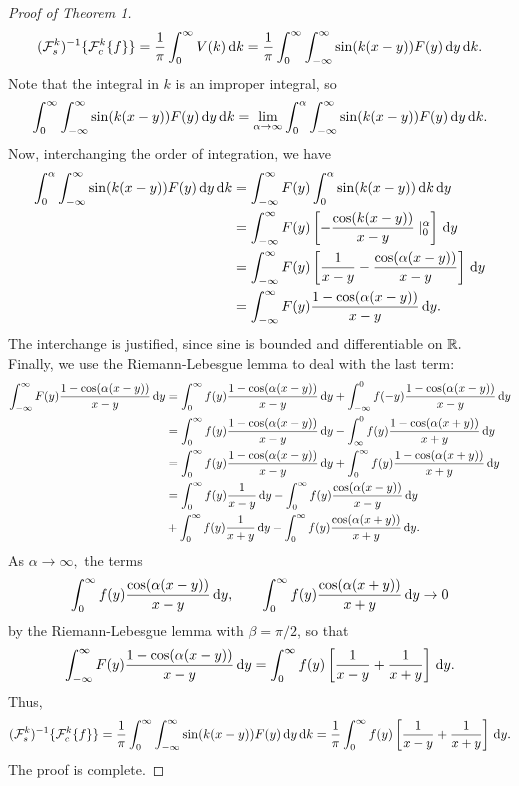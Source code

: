 \documentclass[10pt,reqno,oneside,a4paper, landscape]{article}
\begin{document}
\begin{proof}[Proof of Theorem 1]
\[ 
(\mathcal{F}^k_s)^{-1} \{ \mathcal{F}^k_c \{ f \} \} = \frac{1}{\pi } \int^{\infty}_0 V(k) \,\mathrm{d} k =  \frac{1}{\pi} \int^{\infty}_0 \int_{-\infty}^\infty \sin(k(x-y)) F(y) \,\mathrm{d} y \,\mathrm{d} k.
\]
Note that the integral in $k$ is an improper integral, so
\[
\int^{\infty}_0 \int_{-\infty}^\infty \sin(k(x-y)) F(y) \,\mathrm{d} y \,\mathrm{d} k = \lim_{\alpha \to \infty} \int^{\alpha}_0 \int_{-\infty}^\infty \sin(k(x-y)) F(y) \,\mathrm{d} y \,\mathrm{d} k.
\]
Now, interchanging the order of integration, we have 
\begin{align*}
\int^{\alpha}_0 \int_{-\infty}^\infty \sin(k(x-y)) F(y) \,\mathrm{d} y \,\mathrm{d} k &= \int_{-\infty}^\infty F(y) \int^{\alpha}_0  \sin(k(x-y)) \,\mathrm{d} k  \,\mathrm{d} y \\
&= \int_{-\infty}^\infty F(y) \left[ - \frac{\cos(k(x-y))}{x-y} \mid^\alpha_0 \right] \,\mathrm{d} y \\
&= \int_{-\infty}^\infty F(y) \left[ \frac{1}{x-y} - \frac{\cos(\alpha(x-y))}{x-y} \right] \,\mathrm{d} y \\
&= \int_{-\infty}^\infty F(y)  \frac{1 - \cos(\alpha(x-y))}{x-y} \,\mathrm{d} y.
\end{align*}
The interchange is justified, since sine is bounded and differentiable on $\mathbb R.$ Finally, we use the Riemann-Lebesgue lemma to deal with the last term:
\begin{align*}
\int_{-\infty}^\infty F(y)  \frac{1 - \cos(\alpha(x-y))}{x-y} \,\mathrm{d} y &= \int_0^\infty f(y)  \frac{1 - \cos(\alpha(x-y))}{x-y} \,\mathrm{d} y + \int_{-\infty}^0 f(-y)  \frac{1 - \cos(\alpha(x-y))}{x-y} \,\mathrm{d} y \\
&= \int_0^\infty f(y)  \frac{1 - \cos(\alpha(x-y))}{x-y} \,\mathrm{d} y - \int_{\infty}^0 f(y)  \frac{1 - \cos(\alpha(x+y))}{x+y} \,\mathrm{d} y \\
&= \int_0^\infty f(y)  \frac{1 - \cos(\alpha(x-y))}{x-y} \,\mathrm{d} y + \int^{\infty}_0 f(y)  \frac{1 - \cos(\alpha(x+y))}{x+y} \,\mathrm{d} y \\ 
&= \int_0^\infty f(y)  \frac{1}{x-y} \,\mathrm{d} y - \int_0^\infty f(y) \frac{\cos(\alpha(x-y))}{x-y} \,\mathrm{d} y \\
&+ \int^{\infty}_0 f(y) \frac{1}{x+y} \,\mathrm{d} y - \int^{\infty}_0 f(y) \frac{\cos(\alpha(x+y))}{x+y} \,\mathrm{d} y.
\end{align*}
As $\alpha \to \infty,$ the terms 
\[ \int_0^\infty f(y) \frac{\cos(\alpha(x-y))}{x-y} \,\mathrm{d} y, \qquad \int^{\infty}_0 f(y) \frac{\cos(\alpha(x+y))}{x+y} \,\mathrm{d} y \to 0\]
by the Riemann-Lebesgue lemma with $\beta = \pi/2$, so that 
\[ 
\int_{-\infty}^\infty F(y) \frac{1 - \cos(\alpha(x-y))}{x-y} \,\mathrm{d} y = \int_0^\infty f(y) \left[ \frac{1}{x-y} + \frac{1}{x+y} \right] \,\mathrm{d} y. 
\]
Thus, 
\[ (\mathcal{F}^k_s)^{-1} \{ \mathcal{F}^k_c \{ f \} \} = \frac{1}{\pi} \int^{\infty}_0 \int_{-\infty}^\infty \sin(k(x-y)) F(y) \,\mathrm{d} y \,\mathrm{d} k = \frac{1}{\pi} \int_0^\infty f(y) \left[ \frac{1}{x-y} + \frac{1}{x+y} \right] \,\mathrm{d} y. \]
The proof is complete.
\end{proof}
\end{document}
